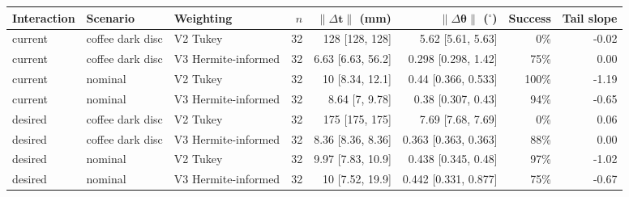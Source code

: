 \begin{tabular}{@{}lllrrrrr@{}}
\toprule
Interaction & Scenario & Weighting & $n$ & $\lVert\Delta\mathbf{t}\rVert$ (mm) & $\lVert\Delta\boldsymbol{\theta}\rVert$ ($^\circ$) & Success & Tail slope \\
\midrule
current & coffee dark disc & V2 Tukey & 32 & 128 [128, 128] & 5.62 [5.61, 5.63] & 0\% & -0.02 \\
current & coffee dark disc & V3 Hermite-informed & 32 & 6.63 [6.63, 56.2] & 0.298 [0.298, 1.42] & 75\% & 0.00 \\
current & nominal & V2 Tukey & 32 & 10 [8.34, 12.1] & 0.44 [0.366, 0.533] & 100\% & -1.19 \\
current & nominal & V3 Hermite-informed & 32 & 8.64 [7, 9.78] & 0.38 [0.307, 0.43] & 94\% & -0.65 \\
desired & coffee dark disc & V2 Tukey & 32 & 175 [175, 175] & 7.69 [7.68, 7.69] & 0\% & 0.06 \\
desired & coffee dark disc & V3 Hermite-informed & 32 & 8.36 [8.36, 8.36] & 0.363 [0.363, 0.363] & 88\% & 0.00 \\
desired & nominal & V2 Tukey & 32 & 9.97 [7.83, 10.9] & 0.438 [0.345, 0.48] & 97\% & -1.02 \\
desired & nominal & V3 Hermite-informed & 32 & 10 [7.52, 19.9] & 0.442 [0.331, 0.877] & 75\% & -0.67 \\
\bottomrule
\end{tabular}
